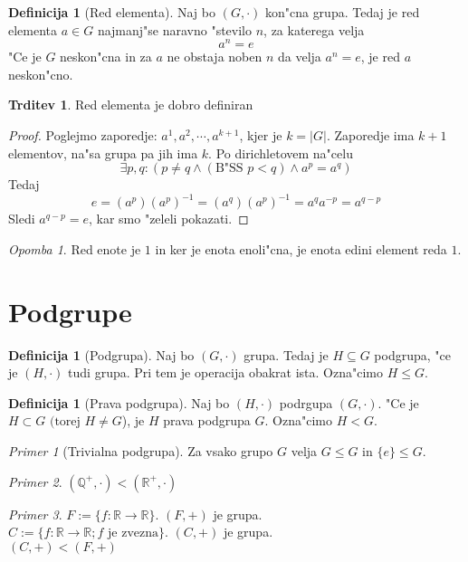 \documentclass[11pt, a4paper]{article}
\theoremstyle{definition}
\newtheorem{defn}[counter]{Definicija}
\newtheorem{claim}[counter]{Trditev}
\theoremstyle{remark}
\newtheorem*{ex}{Primer}
\newtheorem*{rem}{Opomba}
\newcommand{\Q}{\mathbb{Q}}
\newcommand{\R}{\mathbb{R}}
\begin{document}
	\begin{defn}[Red elementa]
		Naj bo $(G, \cdot)$ kon"cna grupa. Tedaj je red elementa $a \in G$ najmanj"se naravno "stevilo $n$, za katerega velja
		\[ a^n = e \]
		"Ce je $G$ neskon"cna in za $a$ ne obstaja noben $n$ da velja $a^n = e$, je red $a$ neskon"cno.
	\end{defn}
	\begin{claim}
		Red elementa je dobro definiran
	\end{claim}
	\begin{proof}
		Poglejmo zaporedje: $a^1, a^2, \cdots, a^{k+1}$, kjer je $k=|G|$. Zaporedje ima $k+1$ elementov, na"sa grupa pa jih ima $k$.
		Po dirichletovem na"celu %
		\[\exists p,q: (p \neq q \land (\text{B"SS } p < q) \land a^p = a^q) \]
		Tedaj
		\[ e = (a^p)(a^p)^{-1} = (a^q)(a^p)^{-1} = a^q a^{-p} = a^{q-p} \]
		Sledi $a^{q-p} = e$, kar smo "zeleli pokazati.
	\end{proof}
	\begin{rem}
		Red enote je $1$ in ker je enota enoli"cna, je enota edini element reda $1$.
	\end{rem}
	
	\section{Podgrupe}
	\begin{defn}[Podgrupa]
		Naj bo $(G, \cdot)$ grupa. Tedaj je $H \subseteq G$ podgrupa, "ce je $(H, \cdot)$ tudi grupa. Pri tem je operacija obakrat ista. Ozna"cimo $H \leq G$.
	\end{defn}
	\begin{defn}[Prava podgrupa]
		Naj bo $(H, \cdot)$ podrgupa $(G, \cdot)$. "Ce je $H \subset G \text{ (torej } H \neq G$), je $H$ prava podgrupa $G$. Ozna"cimo $H < G$.
	\end{defn}
	
	\begin{ex}[Trivialna podgrupa]
		Za vsako grupo $G$ velja $G \leq G$ in $\lbrace e \rbrace \leq G$.
	\end{ex}
	
	\begin{ex}
		$(\Q^+, \cdot) < (\R^+, \cdot)$
	\end{ex}
	\begin{ex}
		$F := \lbrace f: \R \rightarrow \R \rbrace$. $(F, +)$ je grupa. \\
		$C := \lbrace f: \R \rightarrow \R ; f \text{ je zvezna}\rbrace$. $(C, +)$ je grupa. \\
		$(C, +) < (F, +)$
	\end{ex}
\end{document}
